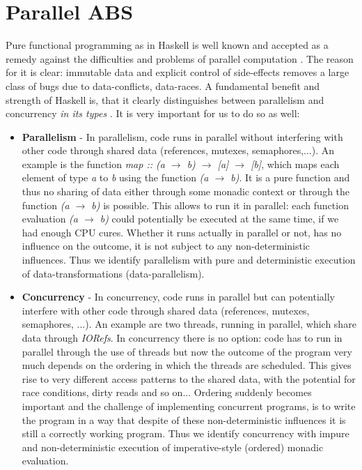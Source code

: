\chapter*{Parallel ABS}
\label{ch:parallel_abs}
Pure functional programming as in Haskell is well known and accepted as a remedy against the difficulties and problems of parallel computation \cite{hudak_history_2007}. The reason for it is clear: immutable data and explicit control of side-effects removes a large class of bugs due to data-conflicts, data-races. A fundamental benefit and strength of Haskell is, that it clearly distinguishes between parallelism and concurrency \textit{in its types} \cite{jones_tackling_2002}. It is very important for us to do so as well:

\begin{itemize}
	\item \textbf{Parallelism} - In parallelism, code runs in parallel without interfering with other code through shared data (references, mutexes, semaphores,...). An example is the function \textit{map :: (a $\rightarrow$ b) $\rightarrow$ [a] $\rightarrow$ [b]}, which maps each element of type \textit{a} to \textit{b} using the function \textit{(a $\rightarrow$ b)}. It is a pure function and thus no sharing of data either through some monadic context or through the function \textit{(a $\rightarrow$ b)} is possible. This allows to run it in parallel: each function evaluation \textit{(a $\rightarrow$ b)} could potentially be executed at the same time, if we had enough CPU cures. Whether it runs actually in parallel or not, has no influence on the outcome, it is not subject to any non-deterministic influences. Thus we identify parallelism with pure and deterministic execution of data-transformations (data-parallelism).
	
	\item \textbf{Concurrency} - In concurrency, code runs in parallel but can potentially interfere with other code through shared data (references, mutexes, semaphores, ...). An example are two threads, running in parallel, which share data through \textit{IORefs}. In concurrency there is no option: code has to run in parallel through the use of threads but now the outcome of the program very much depends on the ordering in which the threads are scheduled. This gives rise to very different access patterns to the shared data, with the potential for race conditions, dirty reads and so on... Ordering suddenly becomes important and the challenge of implementing concurrent programs, is to write the program in a way that despite of these non-deterministic influences it is still a correctly working program. Thus we identify concurrency with impure and non-deterministic execution of imperative-style (ordered) monadic evaluation.
\end{itemize}

